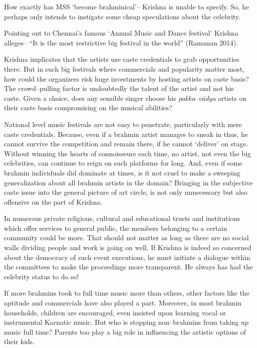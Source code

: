 How exactly has MSS ‘become brahminical’– Krishna is unable to specify. So, he perhaps only intends to instigate some cheap speculations about the celebrity.

Pointing out to Chennai’s famous ‘Annual Music and Dance festival’ Krishna alleges– “It is the most restrictive big festival in the world” (Ramanan 2014).

Krishna implicates that the artists use caste credentials to grab opportunities there. But in such big festivals where commercials and popularity matter most, how could the organizers risk huge investments by hosting artists on caste basis? The crowd–pulling factor is undoubtedly the talent of the artist and not his caste. Given a choice, does any sensible singer choose his \textit{pakka}–\textit{vādya} artists on their caste basis compromising on the musical abilities?

National level music festivals are not easy to penetrate, particularly with mere caste credentials. Because, even if a brahmin artist manages to sneak in thus, he cannot survive the competition and remain there, if he cannot ‘deliver’ on stage. Without winning the hearts of connoisseurs each time, no artist, not even the big celebrities, can continue to reign on such platforms for long. And, even if some brahmin individuals did dominate at times, is it not cruel to make a sweeping generalization about all brahmin artists in the domain? Bringing in the subjective caste issue into the general picture of art circle, is not only unnecessary but also offensive on the part of Krishna.

In numerous private religious, cultural and educational trusts and institutions which offer services to general public, the members belonging to a certain community could be more. That should not matter as long as there are no social walls dividing people and work is going on well. If Krishna is indeed so concerned about the democracy of such event executions, he must initiate a dialogue within the committees to make the proceedings more transparent. He always has had the celebrity status to do so!

If more brahmins took to full time music more than others, other factors like the aptitude and commercials have also played a part. Moreover, in most brahmin households, children are encouraged, even insisted upon learning vocal or instrumental Karnatic music. But who is stopping non–brahmins from taking up music full time? Parents too play a big role in influencing the artistic options of their kids.

